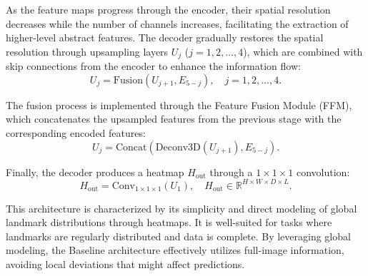 As the feature maps progress through the encoder, their spatial resolution decreases while the number of channels increases, facilitating the extraction of higher-level abstract features. The decoder gradually restores the spatial resolution through upsampling layers \( U_j \) (\( j = 1, 2, \ldots, 4 \)), which are combined with skip connections from the encoder to enhance the information flow:
\begin{equation}
U_j = \text{Fusion}(U_{j+1}, E_{5-j}), \quad j = 1, 2, \ldots, 4.
\end{equation}

The fusion process is implemented through the Feature Fusion Module (FFM), which concatenates the upsampled features from the previous stage with the corresponding encoded features:
\begin{equation}
U_{j} = \text{Concat}(\text{Deconv3D}(U_{j+1}), E_{5-j}).
\end{equation}

Finally, the decoder produces a heatmap \( H_{\text{out}} \) through a \( 1 \times 1 \times 1 \) convolution:
\begin{equation}
H_{\text{out}} = \text{Conv}_{1\times1\times1}(U_1), \quad H_{\text{out}} \in \mathbb{R}^{H \times W \times D \times L}.
\end{equation}


This architecture is characterized by its simplicity and direct modeling of global landmark distributions through heatmaps. It is well-suited for tasks where landmarks are regularly distributed and data is complete. By leveraging global modeling, the Baseline architecture effectively utilizes full-image information, avoiding local deviations that might affect predictions.

